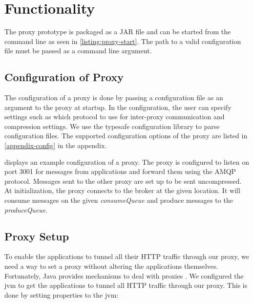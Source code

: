 \section{Functionality}

The proxy prototype is packaged as a JAR file and can be started from the command
line as seen in \cref{listing:proxy-start}. The path to a valid configuration
file must be passed as a command line argument.



\subsection{Configuration of Proxy}
\label{section:proxy-config}

The configuration of a proxy is done by passing a configuration file as an
argument to the proxy at startup. In the configuration, the user can specify
settings such as which protocol to use for inter-proxy communication and
compression settings. We use the typesafe\cite{typesafe-homepage} configuration
library to parse configuration files. The supported configuration options of the
proxy are listed in \cref{appendix-config} in the appendix.

 displays an example configuration of a proxy. The
proxy is configured to listen on port 3001 for messages from applications and
forward them using the AMQP protocol. Messages sent to the other proxy are set
up to be sent uncompressed. At initialization, the proxy connects to the broker
at the given location. It will consume messages on the given
\textit{consumeQueue} and produce messages to the \textit{produceQueue}.





\subsection{Proxy Setup}

To enable the applications to tunnel all their HTTP traffic through our
proxy, we need a way to set a proxy without altering the applications
themselves. Fortunately, Java provides mechanisms to deal with proxies
\cite{oracle-proxy}. We configured the \gls{jvm} to get the applications to
tunnel all HTTP traffic through our proxy. This is done by setting properties to
the \gls{jvm}:


